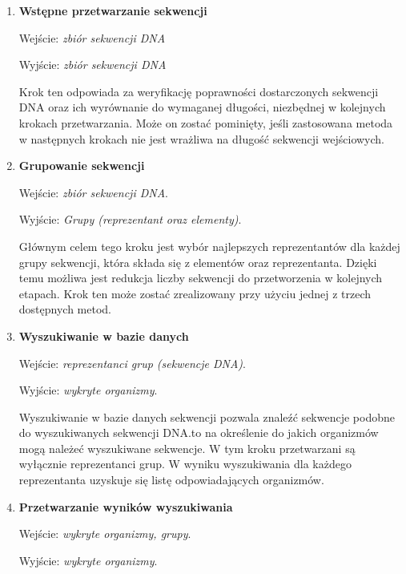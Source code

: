            \begin{enumerate}
                \item {
                    \textbf{Wstępne przetwarzanie sekwencji}

                    Wejście: \textit{zbiór sekwencji DNA}

                    Wyjście: \textit{zbiór sekwencji DNA}

                    Krok ten odpowiada za weryfikację poprawności dostarczonych sekwencji DNA oraz ich wyrównanie do wymaganej długości, niezbędnej w kolejnych krokach przetwarzania. Może on zostać pominięty, jeśli zastosowana metoda w następnych krokach nie jest wrażliwa na długość sekwencji wejściowych.
                }
                \item {
                    \textbf{Grupowanie sekwencji}

                    Wejście: \textit{zbiór sekwencji DNA}.

                    Wyjście: \textit{Grupy (reprezentant oraz elementy)}.

                    Głównym celem tego kroku jest wybór najlepszych reprezentantów dla każdej grupy sekwencji, która składa się z elementów oraz reprezentanta. Dzięki temu możliwa jest redukcja liczby sekwencji do przetworzenia w kolejnych etapach. Krok ten może zostać zrealizowany przy użyciu jednej z trzech dostępnych metod.
                }
                \item {
                    \textbf{Wyszukiwanie w bazie danych}

                    Wejście: \textit{reprezentanci grup (sekwencje DNA)}.

                    Wyjście: \textit{wykryte organizmy}.

                    Wyszukiwanie w bazie danych sekwencji pozwala znaleźć sekwencje podobne do wyszukiwanych sekwencji DNA.\@Pozwala to na określenie do jakich organizmów mogą należeć wyszukiwane sekwencje. W tym kroku przetwarzani są wyłącznie reprezentanci grup. W wyniku wyszukiwania dla każdego reprezentanta uzyskuje się listę odpowiadających organizmów.
                }
                \item {
                    \textbf{Przetwarzanie wyników wyszukiwania}

                    Wejście: \textit{wykryte organizmy, grupy}.

                    Wyjście: \textit{wykryte organizmy}.

}
\end{enumerate}
